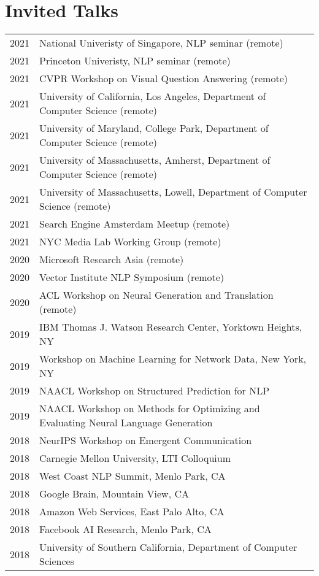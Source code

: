 \documentclass[a4paper,11pt]{article}
\begin{document}
\section{Invited Talks}
\begin{longtable}{rl}
    2021 & National Univeristy of Singapore, NLP seminar (remote) \\
    2021 & Princeton Univeristy, NLP seminar (remote) \\
    2021 & CVPR Workshop on Visual Question Answering (remote) \\
    2021 & University of California, Los Angeles, Department of Computer Science (remote) \\
    2021 & University of Maryland, College Park, Department of Computer Science (remote) \\
    2021 & University of Massachusetts, Amherst, Department of Computer Science (remote) \\
    2021 & University of Massachusetts, Lowell, Department of Computer Science (remote) \\
    2021 & Search Engine Amsterdam Meetup (remote) \\
    2021 & NYC Media Lab Working Group (remote) \\
    2020 & Microsoft Research Asia (remote) \\
    2020 & Vector Institute NLP Symposium (remote) \\
    2020 & ACL Workshop on Neural Generation and Translation (remote) \\
    2019 & IBM Thomas J. Watson Research Center, Yorktown Heights, NY \\
    2019 & Workshop on Machine Learning for Network Data, New York, NY \\
    2019 & NAACL Workshop on Structured Prediction for NLP \\
    2019 & NAACL Workshop on Methods for Optimizing and Evaluating Neural Language Generation \\
    2018 & NeurIPS Workshop on Emergent Communication \\
    2018 & Carnegie Mellon University, LTI Colloquium \\
    2018 & West Coast NLP Summit, Menlo Park, CA \\
    2018 & Google Brain, Mountain View, CA \\
    2018 & Amazon Web Services, East Palo Alto, CA \\
    2018 & Facebook AI Research, Menlo Park, CA \\
    2018 & University of Southern California, Department of Computer Sciences \\

\end{longtable}
\end{document}
